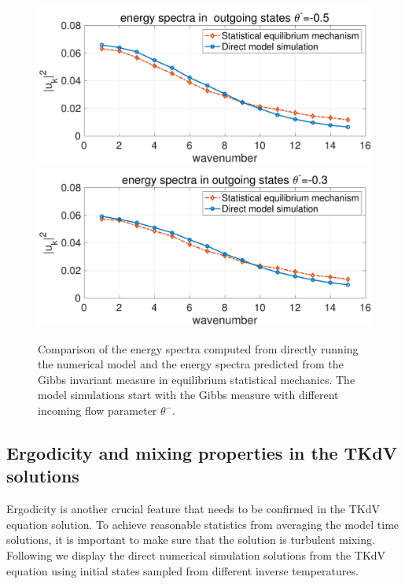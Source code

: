 \documentclass[9pt,twoside,lineno]{pnas-new}
\theoremstyle{plain}
\theoremstyle{plain}
\begin{document}
\begin{figure}
\begin{centering}
\includegraphics[scale=0.32]{./specEqui_th05}\includegraphics[scale=0.32]{./specEqui_th03}
\par\end{centering}
\caption{Comparison of the energy spectra computed from directly running the numerical 
model and the energy spectra predicted from the
Gibbs invariant measure in equilibrium statistical mechanics. The
model simulations start with the Gibbs measure with different
incoming flow parameter $\theta^{-}$.\label{fig:Comparison-spec }}
\end{figure}

\subsection{Ergodicity and mixing properties in the TKdV solutions}

Ergodicity is another crucial feature that needs to be confirmed in
the TKdV equation solution. To achieve reasonable statistics
from averaging the model time solutions, it is important to make sure
that the solution is turbulent mixing. Following we display the
direct numerical simulation solutions from the TKdV equation using
initial states sampled from different inverse temperatures.
\end{document}
